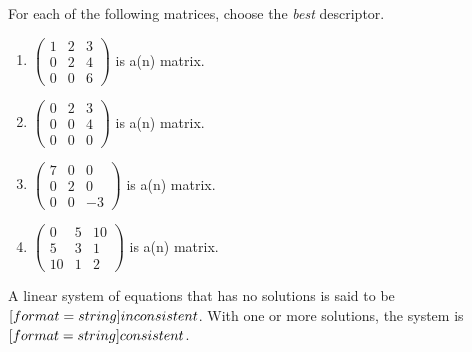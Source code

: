 \documentclass{ximera}
\begin{document}
\begin{question}
For each of the following matrices, choose the {\em best} descriptor.  
\begin{enumerate}
\item $\left(\begin{array}{rrr} 1 & 2 & 3\\ 0 & 2 & 4\\ 0 & 0 & 6\end{array}\right)$ is a(n) 
 matrix.  
\item $\left(\begin{array}{rrr} 0 & 2 & 3\\ 0 & 0 & 4\\ 0 & 0 & 0\end{array}\right)$ is a(n)
 matrix.  
\item $\left(\begin{array}{rrr} 7 & 0 & 0\\ 0 & 2 & 0\\ 0 & 0 & -3\end{array}\right)$ is a(n) 
 matrix.  
\item $\left(\begin{array}{rrr} 0 & 5 & 10\\ 5 & 3 & 1\\ 10 & 1 & 2\end{array}\right)$ is a(n) 
 matrix.  
\end{enumerate}
\end{question}



\begin{question}
A linear system of equations that has no solutions is said to be $[format=string]{inconsistent}$.  With one or more solutions, the system is $[format=string]{consistent}$. 
\end{question} 
\end{document}
